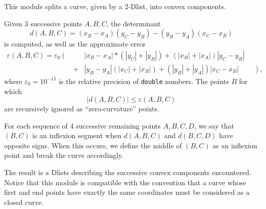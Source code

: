 This module splits a curve, given by a 2-Dlist, into convex components.

\medskip

Given 3 successive points $A,B,C$, the determinant
$$d(A,B,C) = (x_B-x_A)(y_C-y_B)-(y_B-y_A)(x_C-x_B)$$ 
is computed, as well as the approximate error
\begin{eqnarray*}
\varepsilon(A,B,C) = \varepsilon_0 \left( \frac{}{} \right. &\;& 
	|x_B-x_A|*(|y_C|+|y_B|) + (|x_B|+|x_A|)|y_C-y_B| \\
&+&	|y_B-y_A|(|x_C|+|x_B|)  + (|y_B|+|y_A|)|x_C-x_B| 
\qquad \left. \frac{}{} \right),
\end{eqnarray*}
where $\varepsilon_0 = 10^{-15}$ is the relative precision of 
\verb+double+ numbers.
The points $B$ for which 
$$|d(A,B,C)|\leq \varepsilon(A,B,C)$$ 
are recursively ignored as ``zero-curvature'' points.

\medskip

For each sequence of 4 successive remaining points $A,B,C,D$,
we say that $(B,C)$ is an inflexion
segment when $d(A,B,C)$ and $d(B,C,D)$ have opposite signs.
When this occurs, we define the middle of $(B,C)$ as an inflexion
point and break the curve accordingly.

The result is a Dlists describing the successive convex components
encountered. Notice that this module is compatible with the convention
that a curve whose first and end points have exactly the same coordinates
must be considered as a closed curve.


